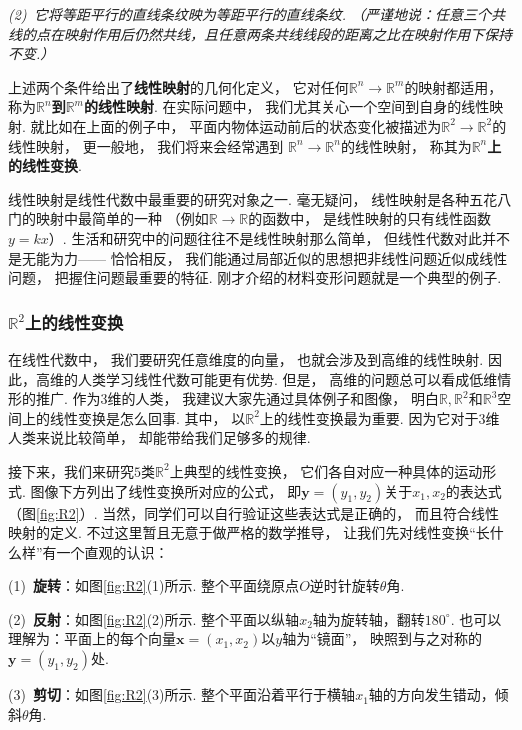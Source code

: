 \textit{(2)~它将等距平行的直线条纹映为等距平行的直线条纹. 
（严谨地说：任意三个共线的点在映射作用后仍然共线，且任意两条共线线段的距离之比在映射作用下保持不变.）} \medskip

上述两个条件给出了\textbf{线性映射}的几何化定义，
它对任何$\mathbb{R}^n \to \mathbb{R}^m$的映射都适用，
称为\textbf{$\mathbb{R}^n$到$\mathbb{R}^m$的线性映射}.
在实际问题中，
我们尤其关心一个空间到自身的线性映射.
就比如在上面的例子中，
平面内物体运动前后的状态变化被描述为$\mathbb{R}^2 \to \mathbb{R}^2$的线性映射，
更一般地，
我们将来会经常遇到
$\mathbb{R}^n \to \mathbb{R}^n$的线性映射，
称其为\textbf{$\mathbb{R}^n$上的线性变换}.

线性映射是线性代数中最重要的研究对象之一.
毫无疑问，
线性映射是各种五花八门的映射中最简单的一种
（例如$\mathbb{R}\to \mathbb{R}$的函数中，
是线性映射的只有线性函数$y=kx$）.
生活和研究中的问题往往不是线性映射那么简单，
但线性代数对此并不是无能为力——
恰恰相反，
我们能通过局部近似的思想把非线性问题近似成线性问题，
把握住问题最重要的特征.
刚才介绍的材料变形问题就是一个典型的例子.

\subsubsection{$\mathbb{R}^2$上的线性变换}

在线性代数中，
我们要研究任意维度的向量，
也就会涉及到高维的线性映射.
因此，高维的人类学习线性代数可能更有优势.
但是，
高维的问题总可以看成低维情形的推广.
作为$3$维的人类，
我建议大家先通过具体例子和图像，
明白$\mathbb{R}, \mathbb{R}^2$和$\mathbb{R}^3$空间上的线性变换是怎么回事.
其中，
以$\mathbb{R}^2$上的线性变换最为重要.
因为它对于$3$维人类来说比较简单，
却能带给我们足够多的规律.

接下来，我们来研究$5$类$\mathbb{R}^2$上典型的线性变换，
它们各自对应一种具体的运动形式.
图像下方列出了线性变换所对应的公式，
即$\bm{y} = (y_1,y_2)$关于$x_1,x_2$的表达式（图\ref{fig:R2}）.
当然，同学们可以自行验证这些表达式是正确的，
而且符合线性映射的定义.
不过这里暂且无意于做严格的数学推导，
让我们先对线性变换“长什么样”有一个直观的认识：\medskip

(1)~\textbf{旋转}：如图\ref{fig:R2}(1)所示.
整个平面绕原点$O$逆时针旋转$\theta$角.


(2)~\textbf{反射}：如图\ref{fig:R2}(2)所示.
整个平面以纵轴$x_2$轴为旋转轴，翻转$180 ^\circ$.
也可以理解为：平面上的每个向量$\bm{x} = (x_1,x_2)$以$y$轴为“镜面”，
映照到与之对称的$\bm{y} = (y_1,y_2)$处.

(3)~\textbf{剪切}：如图\ref{fig:R2}(3)所示.
整个平面沿着平行于横轴$x_1$轴的方向发生错动，倾斜$\theta$角.

